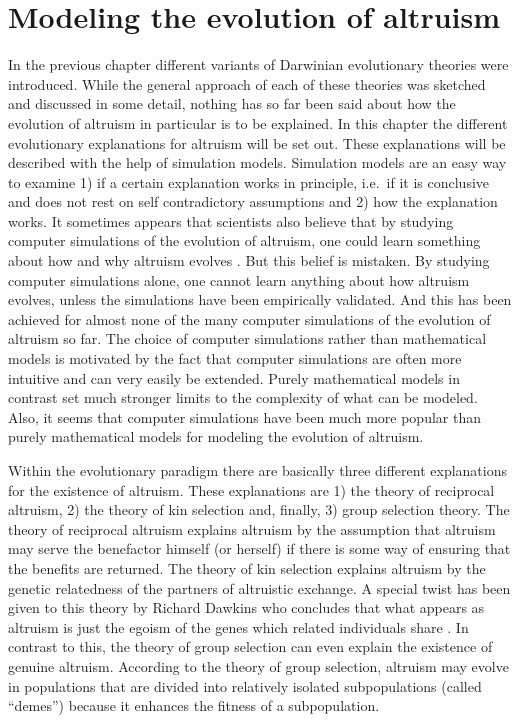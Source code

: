 \chapter{Modeling the evolution of altruism}
\label{modeling}

In the previous chapter different variants of Darwinian evolutionary theories
were introduced. While the general approach of each of these theories was
sketched and discussed in some detail, nothing has so far been said about how
the evolution of altruism in particular is to be explained. In this chapter
the different evolutionary explanations for altruism will be set out.  These
explanations will be described with the help of simulation models.  Simulation
models are an easy way to examine 1) if a certain explanation works in
principle, i.e.\ if it is conclusive and does not rest on self contradictory
assumptions and 2) how the explanation works. It sometimes appears that
scientists also believe that by studying computer simulations of the evolution
of altruism, one could learn something about how and why altruism evolves
\cite[]{axelrod:1984}. But this belief is mistaken. By studying computer
simulations alone, one cannot learn anything about how altruism evolves,
unless the simulations have been empirically validated.  And this has been
achieved for almost none of the many computer simulations of the evolution of
altruism so far. The choice of computer simulations rather than mathematical
models is motivated by the fact that computer simulations are often more
intuitive and can very easily be extended. Purely mathematical models in
contrast set much stronger limits to the complexity of what can be modeled.
Also, it seems that computer simulations have been much more popular than
purely mathematical models for modeling the evolution of altruism.

Within the evolutionary paradigm there are basically three different
explanations for the existence of altruism. These explanations are 1) the
theory of reciprocal altruism, 2) the theory of kin selection and, finally, 3)
group selection theory. The theory of reciprocal altruism explains
altruism by the assumption that altruism may serve the benefactor himself (or
herself) if there is some way of ensuring that the benefits are returned.
The theory of kin selection explains altruism by the genetic relatedness of
the partners of altruistic exchange. A special twist has been given to this
theory by Richard Dawkins who concludes that what appears as altruism is just
the egoism of the genes which related individuals share \cite[p.\ 
278ff.]{dawkins:1976}. In contrast to this, the theory of group selection can
even explain the existence of genuine altruism.  According to the theory of
group selection, altruism may evolve in populations that are divided into
relatively isolated subpopulations (called ``demes'') because it enhances the
fitness of a subpopulation.

